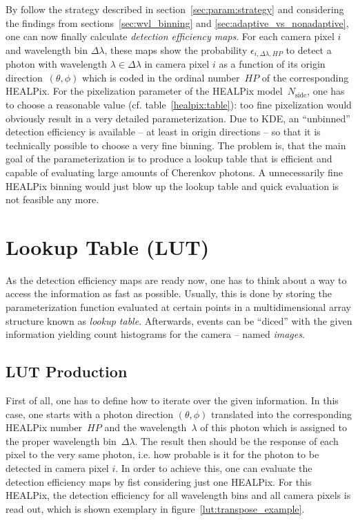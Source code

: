 By follow the strategy described in section~\ref{sec:param:strategy} and considering the findings from sections~\ref{sec:wvl_binning} and \ref{sec:adaptive_vs_nonadaptive}, one can now finally calculate \textit{detection efficiency maps}. For each camera pixel $i$ and wavelength bin $\Delta\lambda$, these maps show the probability $\epsilon_{i,\Delta\lambda,HP}$ to detect a photon with wavelength $\lambda\in\Delta\lambda$ in camera pixel $i$ as a function of its origin direction~$(\theta,\phi)$ which is coded in the ordinal number~$HP$ of the corresponding HEALPix. For the pixelization parameter of the HEALPix model~$N_\text{side}$, one has to choose a reasonable value (cf. table~\ref{healpix:table}): too fine pixelization would obviously result in a very detailed parameterization. Due to KDE, an \enquote{unbinned} detection efficiency is available -- at least in origin directions -- so that it is technically possible to choose a very fine binning. The problem is, that the main goal of the \iceact parameterization is to produce a lookup table that is efficient and capable of evaluating large amounts of Cherenkov photons. A unnecessarily fine HEALPix binning would just blow up the lookup table and quick evaluation is not feasible any more.





\section{Lookup Table (LUT)}

As the detection efficiency maps are ready now, one has to think about a way to access the information as fast as possible. Usually, this is done by storing the parameterization function evaluated at certain points in a multidimensional array structure known as \textit{lookup table}. Afterwards, events can be \enquote{diced} with the given information yielding count histograms for the camera -- named \textit{images}.

\subsection{LUT Production}

First of all, one has to define how to iterate over the given information. In this case, one starts with a photon direction $(\theta,\phi)$ translated into the corresponding HEALPix number~$HP$ and the wavelength~$\lambda$ of this photon which is assigned to the proper wavelength bin~$\Delta\lambda$. The result then should be the response of each pixel to the very same photon, i.e. how probable is it for the photon to be detected in camera pixel $i$. In order to achieve this, one can evaluate the detection efficiency maps by fist considering just one HEALPix. For this HEALPix, the detection efficiency for all wavelength bins and all camera pixels is read out, which is shown exemplary in figure~\ref{lut:transpose_example}. 

